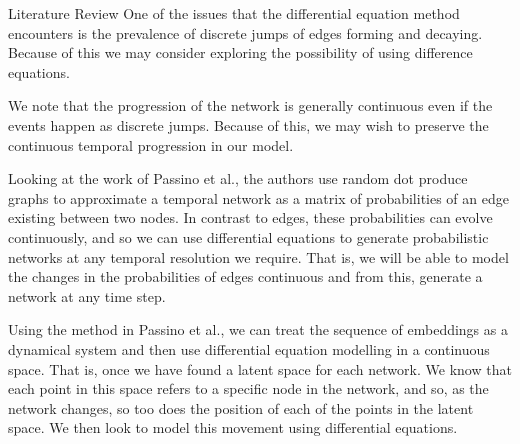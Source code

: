 \documentclass[12pt]{amsart}
\begin{document}
\begin{section}{Literature Review}
        One of the issues that the differential equation method encounters is the prevalence of discrete jumps of edges forming and decaying. Because of this we may consider exploring the possibility of using difference equations.  
    
        We note that the progression of the network is generally continuous even if the events happen as discrete jumps. Because of this, we may wish to preserve the continuous temporal progression in our model.
        

        
        Looking at the work of Passino et al.\cite{sanna2021link}, the authors use random dot produce graphs\cite{athreya2017statistical} to approximate a temporal network as a matrix of probabilities of an edge existing between two nodes. In contrast to edges, these probabilities can evolve continuously, and so we can use differential equations to generate probabilistic networks at any temporal resolution we require. That is, we will be able to model the changes in the probabilities of edges continuous and from this, generate a network at any time step.

        Using the method in Passino et al.\cite{sanna2021link}, we can treat the sequence of embeddings as a dynamical system and then use differential equation modelling in a continuous space. That is, once we have found a latent space for each network. We know that each point in this space refers to a specific node in the network, and so, as the network changes, so too does the position of each of the points in the latent space. We then look to model this movement using differential equations. 
        

\end{section}
\end{document}
